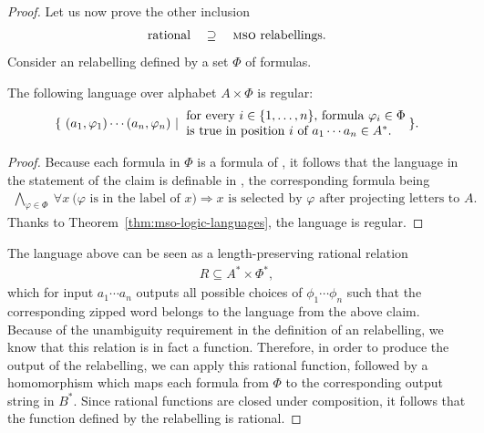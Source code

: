\begin{proof}
Let us now prove the other inclusion
\begin{align*}
    \text{rational} \quad \supseteq \quad \text{\mso relabellings.}
    \end{align*}
    Consider an \mso relabelling defined by a set $\Phi$ of formulas. 
    
\begin{claim}\label{claim:mso-annotation-regular}
    The following language over alphabet $A \times \Phi$ is regular:
\begin{align*}
    \setbuild{ (a_1,\varphi_1) \cdots (a_n,\varphi_n)}{for every $i \in \set{1,\ldots,n}$,  formula $\varphi_i \in \Phi$ \\  is true in position $i$ of $a_1 \cdots a_n \in A^*$.}.
\end{align*}
\end{claim}
\begin{proof}
    Because each formula in $\Phi$ is a formula of \mso, it follows that the language in the statement of the claim is definable in \mso, the corresponding formula being
    \begin{align*}
    \bigwedge_{\varphi \in \Phi} \ \forall x  \ \text{($\varphi$ is in the label of $x$)} \Rightarrow \text{$x$ is selected by $\varphi$ after projecting letters to $A$}.
    \end{align*}
    Thanks to Theorem~\ref{thm:mso-logic-languages}, the language is regular.
\end{proof}

The language above can be seen as a length-preserving rational relation 
\begin{align*}
R \subseteq A^* \times \Phi^*,
\end{align*}
which for input $a_1 \cdots a_n$ outputs all possible choices of $\phi_1 \cdots \phi_n$ such that the corresponding zipped word belongs to the language from the above claim. Because of the unambiguity requirement in the definition of an \mso relabelling, we know that this relation is in fact a function. Therefore, in order to produce the output of the \mso relabelling, we can apply this rational function, followed by a homomorphism which maps each formula from $\Phi$ to the corresponding output string in $B^*$. Since rational functions are closed under composition, it follows that the function defined by the \mso relabelling is rational.
\end{proof}



